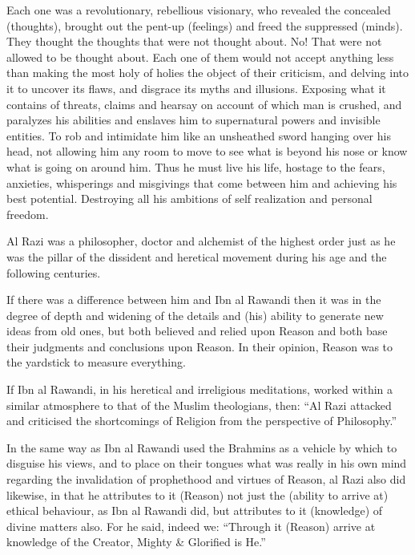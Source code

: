 \documentclass[12pt]{book}
\begin{document}
Each one was a revolutionary, rebellious visionary,
who revealed the concealed (thoughts),
brought out the pent-up (feelings) and freed the suppressed (minds).
They thought the thoughts that were not thought about.
No! That were not allowed to be thought about.
Each one of them would not accept anything less than making the most holy
of holies the object of their criticism,
and delving into it to uncover its flaws,
and disgrace its myths and illusions.
Exposing what it contains of threats, claims and hearsay on account
of which man is crushed, and paralyzes his abilities and enslaves him to
supernatural powers and invisible entities.
To rob and intimidate him like an unsheathed sword hanging over his head,
not allowing him any room to move to see what is beyond his nose or know
what is going on around him.
Thus he must live his life, hostage to the fears, anxieties,
whisperings and misgivings that come between him and
achieving his best potential.
Destroying all his ambitions of self realization and personal freedom.

Al Razi was a philosopher, doctor and alchemist of the highest order just as
he was the pillar of the dissident and heretical movement during his age and
the following centuries.

If there was a difference between him and Ibn al Rawandi then it was in the
degree of depth and widening of the details and (his) ability to generate
new ideas from old ones, but both believed and relied upon Reason and
both base their judgments and conclusions upon Reason.
In their opinion, Reason was to the yardstick to measure everything.

If Ibn al Rawandi, in his heretical and irreligious meditations,
worked within a similar atmosphere to that of the Muslim theologians, then:
“Al Razi attacked and criticised the shortcomings of Religion from the
perspective of Philosophy.”\footnotemark


In the same way as Ibn al Rawandi used the Brahmins as a vehicle by which
to disguise his views, and to place on their tongues what was really in his
own mind regarding the invalidation of prophethood and virtues of Reason,
al Razi also did likewise, in that he attributes to it (Reason) not just the
(ability to arrive at) ethical behaviour, as Ibn al Rawandi did,
but attributes to it (knowledge) of divine matters also.
For he said, indeed we:
“Through it (Reason) arrive at knowledge of the Creator,
Mighty \& Glorified is He.”\footnotemark
\end{document}
